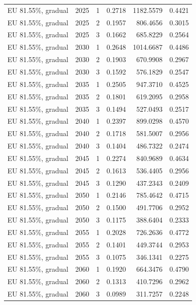 \begin{longtable}{lrrrrr}
EU 81.55\%, gradual & 2025 & 1 & 0.2718 & 1182.5579 & 0.4421 \\
EU 81.55\%, gradual & 2025 & 2 & 0.1957 & 806.4656 & 0.3015 \\
EU 81.55\%, gradual & 2025 & 3 & 0.1662 & 685.8229 & 0.2564 \\
EU 81.55\%, gradual & 2030 & 1 & 0.2648 & 1014.6687 & 0.4486 \\
EU 81.55\%, gradual & 2030 & 2 & 0.1903 & 670.9908 & 0.2967 \\
EU 81.55\%, gradual & 2030 & 3 & 0.1592 & 576.1829 & 0.2547 \\
EU 81.55\%, gradual & 2035 & 1 & 0.2505 & 947.3710 & 0.4525 \\
EU 81.55\%, gradual & 2035 & 2 & 0.1801 & 619.2095 & 0.2958 \\
EU 81.55\%, gradual & 2035 & 3 & 0.1494 & 527.0493 & 0.2517 \\
EU 81.55\%, gradual & 2040 & 1 & 0.2397 & 899.0298 & 0.4570 \\
EU 81.55\%, gradual & 2040 & 2 & 0.1718 & 581.5007 & 0.2956 \\
EU 81.55\%, gradual & 2040 & 3 & 0.1404 & 486.7322 & 0.2474 \\
EU 81.55\%, gradual & 2045 & 1 & 0.2274 & 840.9689 & 0.4634 \\
EU 81.55\%, gradual & 2045 & 2 & 0.1613 & 536.4405 & 0.2956 \\
EU 81.55\%, gradual & 2045 & 3 & 0.1290 & 437.2343 & 0.2409 \\
EU 81.55\%, gradual & 2050 & 1 & 0.2146 & 785.4642 & 0.4715 \\
EU 81.55\%, gradual & 2050 & 2 & 0.1500 & 491.7706 & 0.2952 \\
EU 81.55\%, gradual & 2050 & 3 & 0.1175 & 388.6404 & 0.2333 \\
EU 81.55\%, gradual & 2055 & 1 & 0.2028 & 726.2636 & 0.4772 \\
EU 81.55\%, gradual & 2055 & 2 & 0.1401 & 449.3744 & 0.2953 \\
EU 81.55\%, gradual & 2055 & 3 & 0.1075 & 346.1341 & 0.2275 \\
EU 81.55\%, gradual & 2060 & 1 & 0.1920 & 664.3476 & 0.4790 \\
EU 81.55\%, gradual & 2060 & 2 & 0.1313 & 410.7296 & 0.2962 \\
EU 81.55\%, gradual & 2060 & 3 & 0.0989 & 311.7257 & 0.2248 \\
\end{longtable}
\normalsize
